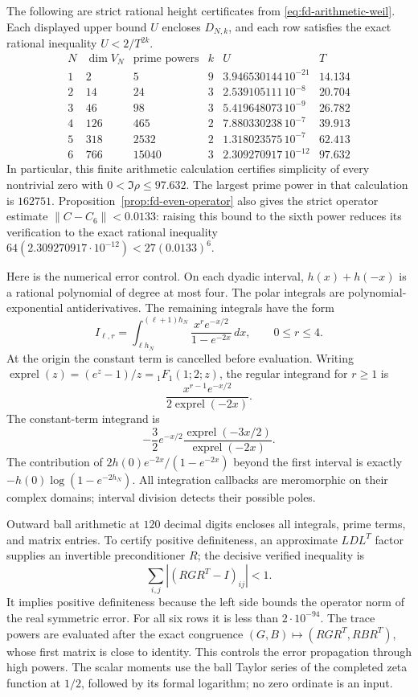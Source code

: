 The following are strict rational height certificates from
\eqref{eq:fd-arithmetic-weil}. Each displayed upper bound \(U\)
encloses \(D_{N,k}\), and each row satisfies the exact rational
inequality \(U<2/T^{2k}\).
\[
\begin{array}{c|r|r|c|c|c}
 N&\dim V_N&\text{prime powers}&k&U&T\\ \hline
 1&2&5&9&3.946530144\,10^{-21}&14.134\\
 2&14&24&3&2.539105111\,10^{-8}&20.704\\
 3&46&98&3&5.419648073\,10^{-9}&26.782\\
 4&126&465&2&7.880330238\,10^{-7}&39.913\\
 5&318&2532&2&1.318023575\,10^{-7}&62.413\\
 6&766&15040&3&2.309270917\,10^{-12}&97.632
\end{array}
\]
In particular, this finite arithmetic calculation certifies
simplicity of every nontrivial zero with
\(0<\Im\rho\le97.632\).
The largest prime power in that calculation is \(162751\).
Proposition~\ref{prop:fd-even-operator} also gives the strict
operator estimate \(\|C-C_6\|<0.0133\): raising this bound
to the sixth power reduces its verification to the exact rational
inequality \(64(2.309270917\cdot10^{-12})<27(0.0133)^6\).

Here is the numerical error control. On each dyadic interval,
\(h(x)+h(-x)\) is a rational polynomial of degree at most four.
The polar integrals are polynomial-exponential antiderivatives.
The remaining integrals have the form
\[
 I_{\ell,r}=\int_{\ell h_N}^{(\ell+1)h_N}
       \frac{x^r e^{-x/2}}{1-e^{-2x}}\,dx,\qquad 0\le r\le4.
\]
At the origin the constant term is cancelled before evaluation.
Writing
\(\operatorname{exprel}(z)=(e^z-1)/z={}_1F_1(1;2;z)\),
the regular integrand for \(r\ge1\) is
\[
 \frac{x^{r-1}e^{-x/2}}{2\operatorname{exprel}(-2x)}.
\]
The constant-term integrand is
\[
 -\frac32 e^{-x/2}
       \frac{\operatorname{exprel}(-3x/2)}
            {\operatorname{exprel}(-2x)}.
\]
The contribution of \(2h(0)e^{-2x}/(1-e^{-2x})\) beyond the
first interval is exactly
\(-h(0)\log(1-e^{-2h_N})\).
All integration callbacks are meromorphic on their complex
domains; interval division detects their possible poles.

Outward ball arithmetic at \(120\) decimal digits encloses all
integrals, prime terms, and matrix entries. To certify positive
definiteness, an approximate \(LDL^T\) factor supplies an
invertible preconditioner \(R\); the decisive verified inequality is
\[
 \sum_{i,j}|(RGR^T-I)_{ij}|<1.
\]
It implies positive definiteness because the left side bounds
the operator norm of the real symmetric error.
For all six rows it is less than \(2\cdot10^{-94}\).
The trace powers are evaluated after the exact congruence
\((G,B)\mapsto(RGR^T,RBR^T)\), whose first matrix is close
to identity. This controls the error propagation through high
powers. The scalar moments use the ball Taylor series of the
completed zeta function at \(1/2\), followed by its formal
logarithm; no zero ordinate is an input.

